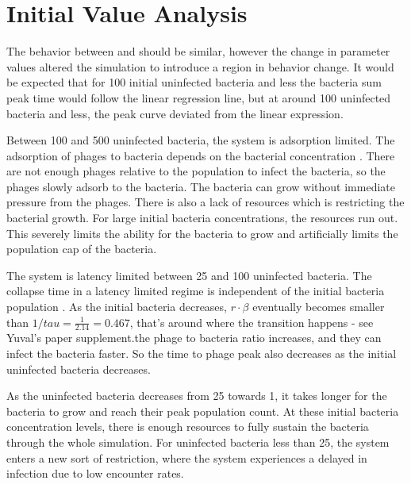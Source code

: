 \section{Initial Value Analysis}
The behavior between  and  should be similar, however the change in parameter values altered the simulation to introduce a region in behavior change. 
It would be expected that for 100 initial uninfected bacteria and less the bacteria sum peak time would follow the linear regression line, but at around 100 uninfected bacteria and less, the peak curve deviated from the linear expression. 

Between 100 and 500 uninfected bacteria, the system is adsorption limited. 
The adsorption of phages to bacteria depends on the bacterial concentration \cite{mullaExtremeDiversityPhage2024}. 
There are not enough phages relative to the population to infect the bacteria, so the phages slowly adsorb to the bacteria. 
The bacteria can grow without immediate pressure from the phages. 
There is also a lack of resources which is restricting the bacterial growth. 
For large initial bacteria concentrations, the resources run out. 
This severely limits the ability for the bacteria to grow and artificially limits the population cap of the bacteria. 

The system is latency limited between 25 and 100 uninfected bacteria. 
The collapse time in a latency limited regime is independent of the initial bacteria population \cite{mullaExtremeDiversityPhage2024}.
As the initial bacteria decreases, $r\cdot \beta$ eventually becomes smaller than $1/tau = \frac{1}{2.14} = 0.467$, that's around where the transition happens - see Yuval's paper supplement.the phage to bacteria ratio increases, and they can infect the bacteria faster. 
So the time to phage peak also decreases as the initial uninfected bacteria decreases. 

As the uninfected bacteria decreases from 25 towards 1, it takes longer for the bacteria to grow and reach their peak population count. 
At these initial bacteria concentration levels, there is enough resources to fully sustain the bacteria through the whole simulation. 
For uninfected bacteria less than 25, the system enters a new sort of restriction, where the system experiences a delayed in infection due to low encounter rates. 


